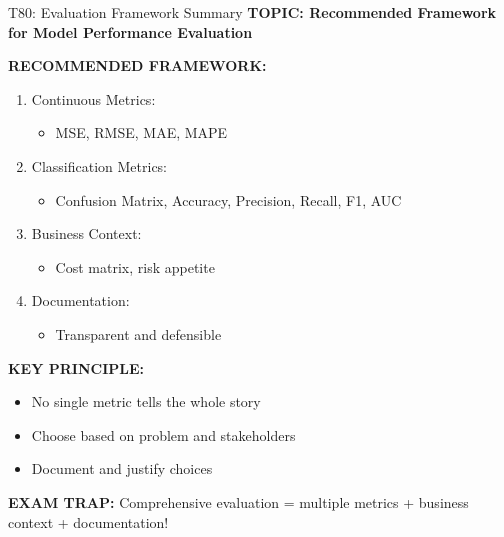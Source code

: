 \documentclass[8pt]{beamer}
\begin{document}
	\begin{frame}{T80: Evaluation Framework Summary}
		\fontsize{6.5}{7.5}\selectfont
		\textbf{TOPIC: Recommended Framework for Model Performance Evaluation}
		
		\vspace{0.1cm}
		\textbf{RECOMMENDED FRAMEWORK:}
		\begin{enumerate}
			\item \textcolor{myblue}{Continuous Metrics:}
			\begin{itemize}
				\item MSE, RMSE, MAE, MAPE
			\end{itemize}
			
			\item \textcolor{myblue}{Classification Metrics:}
			\begin{itemize}
				\item Confusion Matrix, Accuracy, Precision, Recall, F1, AUC
			\end{itemize}
			
			\item \textcolor{myblue}{Business Context:}
			\begin{itemize}
				\item Cost matrix, risk appetite
			\end{itemize}
			
			\item \textcolor{myblue}{Documentation:}
			\begin{itemize}
				\item Transparent and defensible
			\end{itemize}
		\end{enumerate}
		
		\vspace{0.1cm}
		\textbf{KEY PRINCIPLE:}
		\begin{itemize}
			\item No single metric tells the whole story
			\item Choose based on problem and stakeholders
			\item Document and justify choices
		\end{itemize}
		
		\textcolor{myred}{\textbf{EXAM TRAP:}} Comprehensive evaluation = \textcolor{myblue}{multiple metrics + business context + documentation}!
	\end{frame}
	
	
\end{document}
